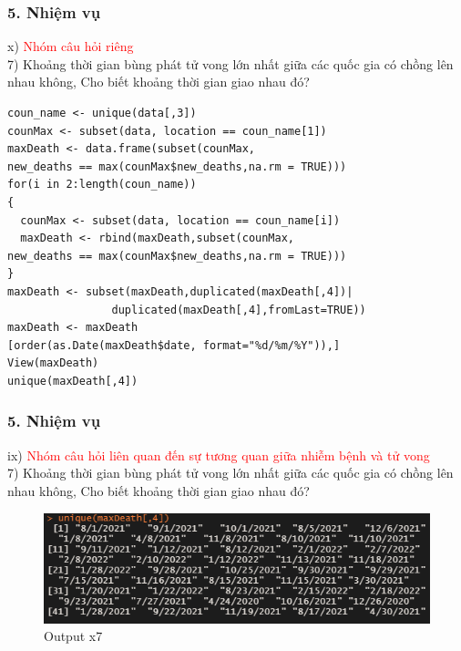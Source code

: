 \documentclass[english,10pt,table]{beamer}
\begin{document}
\begin{frame}[fragile]
\frametitle{5.  Nhiệm vụ}
x) \textcolor{red}{Nhóm câu hỏi riêng}\\
  7) Khoảng thời gian bùng phát tử vong lớn nhất giữa các quốc gia có chồng lên nhau không, Cho biết khoảng thời gian giao nhau đó?
\lstset{
    title=Source code for x7}
\begin{lstlisting}[frame=single]  
coun_name <- unique(data[,3])
counMax <- subset(data, location == coun_name[1])
maxDeath <- data.frame(subset(counMax,
new_deaths == max(counMax$new_deaths,na.rm = TRUE)))
for(i in 2:length(coun_name))
{
  counMax <- subset(data, location == coun_name[i])
  maxDeath <- rbind(maxDeath,subset(counMax,
new_deaths == max(counMax$new_deaths,na.rm = TRUE)))
}
maxDeath <- subset(maxDeath,duplicated(maxDeath[,4])|
                duplicated(maxDeath[,4],fromLast=TRUE))
maxDeath <- maxDeath
[order(as.Date(maxDeath$date, format="%d/%m/%Y")),]
View(maxDeath)
unique(maxDeath[,4])
\end{lstlisting}
\end{frame}

\begin{frame}[fragile]
\frametitle{5.  Nhiệm vụ}
ix) \textcolor{red}{Nhóm câu hỏi liên quan đến sự tương quan giữa nhiễm bệnh và tử vong}\\
  7) Khoảng thời gian bùng phát tử vong lớn nhất giữa các quốc gia có chồng lên nhau không, Cho biết khoảng thời gian giao nhau đó?
	\begin{figure}[h!]
	\begin{center}
		    \includegraphics[scale = 0.4]{Images/X/x7.png}
		     \caption{Output x7}
		\end{center}
		\end{figure}
\end{frame}
\end{document}
